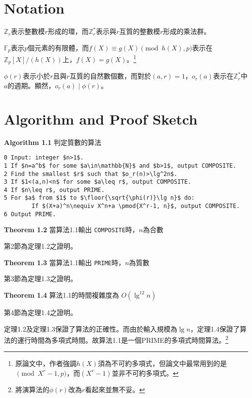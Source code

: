 \documentclass{article}
\DeclarePairedDelimiter\floor{\lfloor}{\rfloor}
\newcommand{\nequiv}{\not\equiv}
\begin{document}
\section{Notation}

    $\mathbb{Z}_r$表示整數模$r$形成的環，而$\mathbb{Z}_r^*$表示與$r$互質的整數模$r$形成的乘法群。

    $\mathbb{F}_p$表示$p$個元素的有限體，而$f(X)\equiv g(X)\pmod{h(X), p}$表示在$\mathbb{Z}_p[X]/(h(X))$上，$f(X)=g(X)$。\footnote{原論文中，作者強調$h(X)$須為不可約多項式，但論文中最常用到的是$\pmod{X^r-1, p}$，而$(X^r-1)$並非不可約多項式。}

    $\phi(r)$表示小於$r$且與$r$互質的自然數個數，而對於$(a,r)=1$，$o_r(a)$表示在$\mathbb{Z}_r^*$中$a$的週期。顯然，$o_r(a)\mid\phi(r)$。

\section{Algorithm and Proof Sketch}
\begin{mdframed}
\noindent\textbf{Algorithm 1.1} 判定質數的算法
\begin{lstlisting}[mathescape=true]
0 Input: integer $n>1$.
1 If $n=a^b$ for some $a\in\mathbb{N}$ and $b>1$, output COMPOSITE.
2 Find the smallest $r$ such that $o_r(n)>\lg^2n$.
3 If $1<(a,n)<n$ for some $a\leq r$, output COMPOSITE.
4 If $n\leq r$, output PRIME.
5 For $a$ from $1$ to $\floor{\sqrt{\phi(r)}\lg n}$ do:
        If $(X+a)^n\nequiv X^n+a \pmod{X^r-1, n}$, output COMPOSITE.
6 Output PRIME.
\end{lstlisting}
\end{mdframed}

\begin{mdframed}
\noindent\textbf{Theorem 1.2} 當算法1.1輸出 \texttt{COMPOSITE}時，$n$為合數
\end{mdframed}
第2節為定理1.2之證明。

\begin{mdframed}
\noindent\textbf{Theorem 1.3} 當算法1.1輸出 \texttt{PRIME}時，$n$為質數
\end{mdframed}
第3節為定理1.3之證明。

\begin{mdframed}
\noindent\textbf{Theorem 1.4} 算法1.1的時間複雜度為 \(O(\lg^{12}n)\)
\end{mdframed}
    第4節為定理1.4之證明。

    定理1.2及定理1.3保證了算法的正確性。而由於輸入規模為$\lg n$，定理1.4保證了算法的運行時間為多項式時間。故算法1.1是一個PRIME的多項式時間算法。\footnote{將演算法的$\phi(r)$改為$r$看起來並無不妥。}
\end{document}
